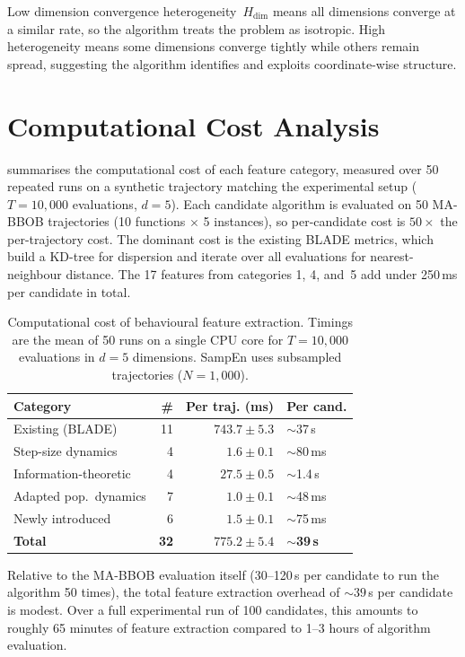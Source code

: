Low dimension convergence heterogeneity~$H_{\mathrm{dim}}$ means all
dimensions converge at a similar rate, so the
algorithm treats the problem as isotropic.  High heterogeneity means some
dimensions converge tightly while others remain spread, suggesting the algorithm
identifies and exploits coordinate-wise structure.

\section{Computational Cost Analysis}
\label{sec:features:cost}

 summarises the computational cost of each feature
category, measured over 50 repeated runs on a synthetic trajectory matching
the experimental setup ($T = 10{,}000$ evaluations, $d = 5$).  Each candidate
algorithm is evaluated on 50 MA-BBOB trajectories (10 functions
$\times$ 5 instances), so per-candidate cost is $50\times$ the per-trajectory
cost.  The dominant cost is the existing BLADE metrics, which build a KD-tree
for dispersion and iterate over all evaluations for nearest-neighbour
distance.  The 17 features from categories 1, 4, and~5 add under 250\,ms per
candidate in total.

\begin{table}[t]
  \centering
  \caption{Computational cost of behavioural feature extraction.  Timings
    are the mean of 50 runs on a single CPU core for $T = 10{,}000$ evaluations
    in $d = 5$ dimensions.  SampEn uses subsampled trajectories ($N = 1{,}000$).}
  \label{tab:feature_cost}
  \footnotesize
  \begin{tabular}{@{}lrrl@{}}
    \toprule
    Category & \# & Per traj. (ms) & Per cand. \\
    \midrule
    Existing (BLADE)            & 11 & $743.7 \pm 5.3$   & $\sim$37\,s   \\
    Step-size dynamics          &  4 & $1.6 \pm 0.1$     & $\sim$80\,ms  \\
    Information-theoretic       &  4 & $27.5 \pm 0.5$    & $\sim$1.4\,s  \\
    Adapted pop.\ dynamics      &  7 & $1.0 \pm 0.1$     & $\sim$48\,ms  \\
    Newly introduced            &  6 & $1.5 \pm 0.1$     & $\sim$75\,ms  \\
    \midrule
    \textbf{Total}              & \textbf{32} & $\mathbf{775.2 \pm 5.4}$ & $\sim$\textbf{39\,s} \\
    \bottomrule
  \end{tabular}
\end{table}

Relative to the MA-BBOB evaluation itself (30--120\,s per candidate to run
the algorithm 50 times), the total feature extraction overhead of
${\sim}39$\,s per candidate is modest.  Over a full experimental run of 100
candidates, this amounts to roughly 65 minutes of feature extraction compared
to 1--3 hours of algorithm evaluation.
